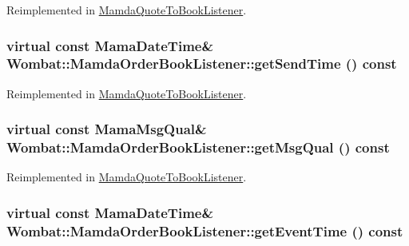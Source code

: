 Reimplemented in \hyperlink{classMamdaQuoteToBookListener_e6897c75c5d12dc67f573946499506b3}{Mamda\-Quote\-To\-Book\-Listener}.\hypertarget{classWombat_1_1MamdaOrderBookListener_244f7440a5a3f0bb81419cae5718ddd8}{
\subsubsection[getSendTime]{\setlength{\rightskip}{0pt plus 5cm}virtual const Mama\-Date\-Time\& Wombat::Mamda\-Order\-Book\-Listener::get\-Send\-Time () const}}
\label{classWombat_1_1MamdaOrderBookListener_244f7440a5a3f0bb81419cae5718ddd8}




Reimplemented in \hyperlink{classMamdaQuoteToBookListener_f36e8e40182ebe8d6e1c2d5445e0590e}{Mamda\-Quote\-To\-Book\-Listener}.\hypertarget{classWombat_1_1MamdaOrderBookListener_a1486090a37ac30c038d18a38ae89d72}{
\subsubsection[getMsgQual]{\setlength{\rightskip}{0pt plus 5cm}virtual const Mama\-Msg\-Qual\& Wombat::Mamda\-Order\-Book\-Listener::get\-Msg\-Qual () const}}
\label{classWombat_1_1MamdaOrderBookListener_a1486090a37ac30c038d18a38ae89d72}




Reimplemented in \hyperlink{classMamdaQuoteToBookListener_78bc7b821c48a99ecdff7f959763f7e2}{Mamda\-Quote\-To\-Book\-Listener}.\hypertarget{classWombat_1_1MamdaOrderBookListener_c0272dc0cb65d7b3a55b8216b12acda6}{
\subsubsection[getEventTime]{\setlength{\rightskip}{0pt plus 5cm}virtual const Mama\-Date\-Time\& Wombat::Mamda\-Order\-Book\-Listener::get\-Event\-Time () const}}
\label{classWombat_1_1MamdaOrderBookListener_c0272dc0cb65d7b3a55b8216b12acda6}




